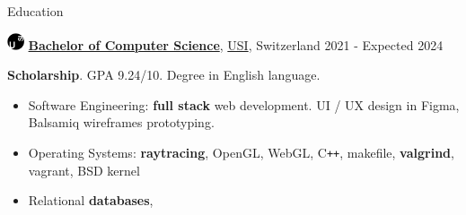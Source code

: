 \documentclass{resume} %
\def\titlelistvspace{-0.15cm}
\begin{document}
\begin{rSection}{Education}

    \includegraphics[width=0.5cm, trim={0cm 5cm 0cm 0cm}]{usi-icon.png}
    {\bf \underline{Bachelor of Computer Science}},
    \href{https://www.usi.ch/en}{USI}, Switzerland
    \hfill {2021 - Expected 2024}

    \textbf{Scholarship}. GPA 9.24/10. Degree in English language.

    \vspace{\titlelistvspace}\begin{itemize}
        \itemsep -3pt {}
        \item Software Engineering: \textbf{full stack} web development.
              UI / UX design in Figma, Balsamiq wireframes prototyping.
        \item Operating Systems:
              \textbf{raytracing},
              OpenGL,
              WebGL,
              C\texttt{++},
              makefile,
              \textbf{valgrind},
              vagrant,
              BSD kernel
        \item Relational \textbf{databases},

\end{itemize}
\end{rSection}
\end{document}
